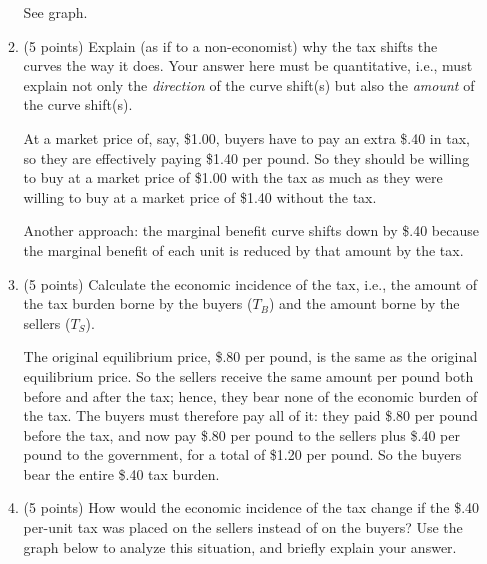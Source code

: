 \documentclass{article}
\begin{document}
\begin{enumerate}
\begin{enumerate}
\begin{KEY} See graph. \end{KEY}


\item \begin{EXAM} (5 points) Explain (as if to a non-economist) why the tax shifts the curves the way it does. Your answer here must be quantitative, i.e., must explain not only the \emph{direction} of the curve shift(s) but also the \emph{amount} of the curve shift(s). \vspace{1.5in} \end{EXAM} 

\begin{KEY} At a market price of, say, \$1.00, buyers have to pay an extra \$.40 in tax, so they are effectively paying \$1.40 per pound. So they should be willing to buy at a market price of \$1.00 with the tax as much as they were willing to buy at a market price of \$1.40 without the tax. 

Another approach: the marginal benefit curve shifts down by \$.40 because the marginal benefit of each unit is reduced by that amount by the tax. \end{KEY} 

\item \begin{EXAM} (5 points) Calculate the economic incidence of the tax, i.e., the amount of the tax burden borne by the buyers ($T_B$) and the amount borne by the sellers ($T_S$). \vspace{1.5in} \end{EXAM} 

\begin{KEY} The original equilibrium price, \$.80 per pound, is the same as the original equilibrium price. So the sellers receive the same amount per pound both before and after the tax; hence, they bear none of the economic burden of the tax. The buyers must therefore pay all of it: they paid \$.80 per pound before the tax, and now pay \$.80 per pound to the sellers plus \$.40 per pound to the government, for a total of \$1.20 per pound. So the buyers bear the entire \$.40 tax burden. \end{KEY} 


\item \begin{EXAM} (5 points) How would the economic incidence of the tax change if the \$.40 per-unit tax was placed on the sellers instead of on the buyers? Use the graph below to analyze this situation, and briefly explain your answer. \vspace{2in} \end{EXAM} 


\end{enumerate}
\end{enumerate}
\end{document}
